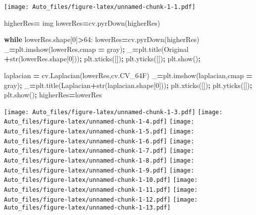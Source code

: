 \documentclass[
]{article}
\newenvironment{Shaded}{\begin{snugshade}}{\end{snugshade}}
\newcommand{\BuiltInTok}[1]{#1}
\newcommand{\ControlFlowTok}[1]{\textcolor[rgb]{0.13,0.29,0.53}{\textbf{#1}}}
\newcommand{\DecValTok}[1]{\textcolor[rgb]{0.00,0.00,0.81}{#1}}
\newcommand{\NormalTok}[1]{#1}
\newcommand{\OperatorTok}[1]{\textcolor[rgb]{0.81,0.36,0.00}{\textbf{#1}}}
\newcommand{\StringTok}[1]{\textcolor[rgb]{0.31,0.60,0.02}{#1}}
\begin{document}
\texttt{[image: Auto\_files/figure-latex/unnamed-chunk-1-1.pdf]}

\begin{Shaded}
\begin{Highlighting}[]

\NormalTok{higherRes}\OperatorTok{=}\NormalTok{ img}
\NormalTok{lowerRes}\OperatorTok{=}\NormalTok{cv.pyrDown(higherRes)}

\ControlFlowTok{while}\NormalTok{ lowerRes.shape[}\DecValTok{0}\NormalTok{]}\OperatorTok{\textgreater{}}\DecValTok{64}\NormalTok{:}
\NormalTok{  lowerRes}\OperatorTok{=}\NormalTok{cv.pyrDown(higherRes)}
\NormalTok{  \_}\OperatorTok{=}\NormalTok{plt.imshow(lowerRes,cmap }\OperatorTok{=} \StringTok{\textquotesingle{}gray\textquotesingle{}}\NormalTok{)}\OperatorTok{;}
\NormalTok{  \_}\OperatorTok{=}\NormalTok{plt.title(}\StringTok{\textquotesingle{}Original \textquotesingle{}}\OperatorTok{+}\BuiltInTok{str}\NormalTok{(lowerRes.shape[}\DecValTok{0}\NormalTok{]))}\OperatorTok{;}\NormalTok{ plt.xticks([])}\OperatorTok{;}\NormalTok{ plt.yticks([])}\OperatorTok{;}
\NormalTok{  plt.show()}\OperatorTok{;}
  
\NormalTok{  laplacian }\OperatorTok{=}\NormalTok{ cv.Laplacian(lowerRes,cv.CV\_64F)}
\NormalTok{  \_}\OperatorTok{=}\NormalTok{plt.imshow(laplacian,cmap }\OperatorTok{=} \StringTok{\textquotesingle{}gray\textquotesingle{}}\NormalTok{)}\OperatorTok{;}
\NormalTok{  \_}\OperatorTok{=}\NormalTok{plt.title(}\StringTok{\textquotesingle{}Laplacian\textquotesingle{}}\OperatorTok{+}\BuiltInTok{str}\NormalTok{(laplacian.shape[}\DecValTok{0}\NormalTok{]))}\OperatorTok{;}\NormalTok{ plt.xticks([])}\OperatorTok{;}\NormalTok{ plt.yticks([])}\OperatorTok{;}
\NormalTok{  plt.show()}\OperatorTok{;}
\NormalTok{  higherRes}\OperatorTok{=}\NormalTok{lowerRes}
\end{Highlighting}
\end{Shaded}

\texttt{[image: Auto\_files/figure-latex/unnamed-chunk-1-3.pdf]}
\texttt{[image: Auto\_files/figure-latex/unnamed-chunk-1-4.pdf]}
\texttt{[image: Auto\_files/figure-latex/unnamed-chunk-1-5.pdf]}
\texttt{[image: Auto\_files/figure-latex/unnamed-chunk-1-6.pdf]}
\texttt{[image: Auto\_files/figure-latex/unnamed-chunk-1-7.pdf]}
\texttt{[image: Auto\_files/figure-latex/unnamed-chunk-1-8.pdf]}
\texttt{[image: Auto\_files/figure-latex/unnamed-chunk-1-9.pdf]}
\texttt{[image: Auto\_files/figure-latex/unnamed-chunk-1-10.pdf]}
\texttt{[image: Auto\_files/figure-latex/unnamed-chunk-1-11.pdf]}
\texttt{[image: Auto\_files/figure-latex/unnamed-chunk-1-12.pdf]}
\texttt{[image: Auto\_files/figure-latex/unnamed-chunk-1-13.pdf]}
\end{document}
